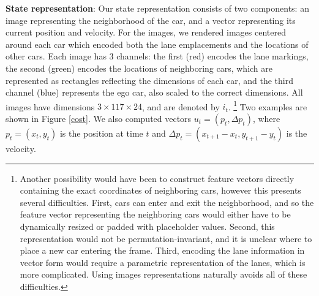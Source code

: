 \documentclass{article} %
\begin{document}
\textbf{State representation}:
Our state representation consists of two components: an image representing the neighborhood of the car, and a vector representing its current position and velocity.
For the images, we rendered images centered around each car which encoded both the lane emplacements and the locations of other cars.
Each image has 3 channels: the first (red) encodes the lane markings, the second (green) encodes the locations of neighboring cars, which are represented as rectangles reflecting the dimensions of each car, and the third channel (blue) represents the ego car, also scaled to the correct dimensions.
All images have dimensions $3 \times 117 \times 24$, and are denoted by $i_t$.
\footnote{Another possibility would have been to construct feature vectors directly containing the exact coordinates of neighboring cars, however this presents several difficulties.
First, cars can enter and exit the neighborhood, and so the feature vector representing the neighboring cars would either have to be dynamically resized or padded with placeholder values.
Second, this representation would not be permutation-invariant, and it is unclear where to place a new car entering the frame.
Third, encoding the lane information in vector form would require a parametric representation of the lanes, which is more complicated.
Using images representations naturally avoids all of these difficulties.}
Two examples are shown in Figure \ref{cost}.
We also computed vectors $u_t = (p_t, \Delta p_t)$, where $p_t = (x_t, y_t)$ is the position at time $t$ and $\Delta p_t = (x_{t+1} - x_t, y_{t+1} - y_t)$ is the velocity.
\end{document}
